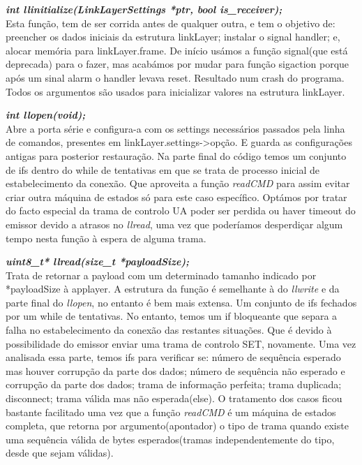 \documentclass[a4paper]{article}
\begin{document}
\noindent\textbf{\textit{int llinitialize(LinkLayerSettings *ptr, bool
is\_receiver);}}\\
Esta função, tem de ser corrida antes de qualquer outra, e tem o objetivo de: preencher os dados iniciais da estrutura
linkLayer; instalar o signal handler; e, alocar memória para
linkLayer.frame. De início usámos a função signal(que
está deprecada) para o
fazer, mas acabámos por mudar para função sigaction porque após um sinal alarm
o handler levava reset. Resultado num crash do programa. Todos os argumentos
são usados para inicializar valores na estrutura linkLayer.\linebreak

\noindent\textbf{\textit{int llopen(void);}}\\
Abre a porta série e configura-a com os settings necessários passados pela linha de
comandos, presentes em linkLayer.settings->{opção}. E guarda as configurações
antigas para posterior restauração. Na parte final do código temos um conjunto
de ifs dentro do while de tentativas em que se trata de processo inicial de
estabelecimento da conexão. Que aproveita a função \textit{readCMD} para assim
evitar criar outra máquina de estados só para este caso específico. Optámos por
tratar do facto especial da trama de controlo UA poder ser
perdida ou haver timeout do emissor devido a atrasos no \textit{llread}, uma vez
que poderíamos desperdiçar algum tempo nesta função à espera de alguma trama.
\linebreak

\noindent\textbf{\textit{uint8\_t* llread(size\_t *payloadSize);}}\\
Trata de retornar a payload com um determinado tamanho indicado por
*payloadSize à applayer. A estrutura da função é semelhante à do
\textit{llwrite} e da parte final do \textit{llopen}, no entanto é bem mais
extensa. Um conjunto de ifs fechados por um while de tentativas. No entanto,
temos um if bloqueante que separa a falha no estabelecimento da conexão das
restantes situações. Que é devido à possibilidade do emissor enviar uma trama de controlo SET,
novamente. Uma vez analisada essa parte, temos ifs para verificar se: número de
sequência esperado mas houver corrupção da parte dos dados; número de
sequência não esperado e corrupção da parte dos dados; trama de informação
perfeita; trama duplicada; disconnect; trama válida mas não esperada(else). O
tratamento dos casos ficou bastante facilitado uma vez que a função
\textit{readCMD} é um máquina de estados completa, que retorna por
argumento(apontador) o tipo de trama quando existe uma sequência válida de
bytes esperados(tramas independentemente do tipo, desde que sejam válidas). \linebreak
\end{document}
